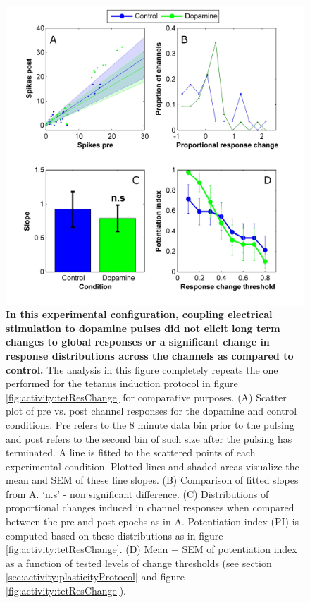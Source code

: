   \begin{figure}[!htb]
       \centering
       \includegraphics[width=15cm]{chapter6/figures/dopamineStats/dopamineStats.jpg}
       \caption[Statistics of the change in evoked responses following dopamine or blank pulsing]{\textbf{In this experimental configuration, coupling electrical stimulation to dopamine pulses did not elicit long term changes to global responses or a significant change in response distributions across the channels as compared to control.} The analysis in this figure completely repeats the one performed for the tetanus induction protocol in figure \ref{fig:activity:tetResChange} for comparative purposes. (A) Scatter plot of pre vs. post channel responses for the dopamine and control conditions. Pre refers to the 8 minute data bin prior to the pulsing and post refers to the second bin of such size after the pulsing has terminated. A line is fitted to the scattered points of each experimental condition. Plotted lines and shaded areas visualize the mean and SEM of these line slopes. (B) Comparison of fitted slopes from A. `n.s' - non significant difference. (C) Distributions of proportional changes induced in channel responses when compared between the pre and post epochs as in A. Potentiation index (PI) is computed based on these distributions as in figure \ref{fig:activity:tetResChange}. (D) Mean + SEM of potentiation index as a function of tested levels of change thresholds (see section \ref{sec:activity:plasticityProtocol} and figure \ref{fig:activity:tetResChange}).}
       \label{fig:pulses:dopamineStats}
  \end{figure}

